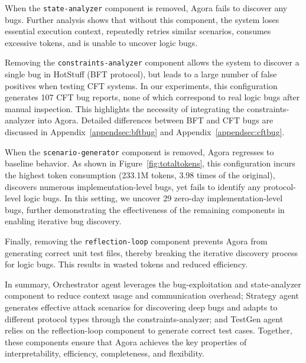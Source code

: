 \documentclass{article}
\theoremstyle{plain}
\theoremstyle{definition}
\theoremstyle{remark}
\newcommand{\consensustester}{Agora\xspace}
\newcommand{\agenta}{Orchestrator\xspace}
\newcommand{\agentb}{Strategy\xspace}
\newcommand{\agentc}{TestGen\xspace}
\begin{document}
When the \texttt{state-analyzer} component is removed, \consensustester fails to discover any bugs. Further analysis shows that without this component, the system loses essential execution context, repeatedly retries similar scenarios, consumes excessive tokens, and is unable to uncover logic bugs.

Removing the \texttt{constraints-analyzer} component allows the system to discover a single bug in HotStuff (BFT protocol), but leads to a large number of false positives when testing CFT systems. In our experiments, this configuration generates 107 CFT bug reports, none of which correspond to real logic bugs after manual inspection. This highlights the necessity of integrating the constraints-analyzer into \consensustester. Detailed differences between BFT and CFT bugs are discussed in Appendix~\ref{appendsec:bftbug} and Appendix~\ref{appendsec:cftbug}.

When the \texttt{scenario-generator} component is removed, \consensustester regresses to baseline behavior. As shown in Figure~\ref{fig:totaltokens}, this configuration incurs the highest token consumption (233.1M tokens, 3.98 times of the original), discovers numerous implementation-level bugs, yet fails to identify any protocol-level logic bugs. In this setting, we uncover 29 zero-day implementation-level bugs, further demonstrating the effectiveness of the remaining components in enabling iterative bug discovery.


Finally, removing the \texttt{reflection-loop} component prevents \consensustester from generating correct unit test files, thereby breaking the iterative discovery process for logic bugs. This results in wasted tokens and reduced efficiency.

In summary, \agenta agent leverages the bug-exploitation and state-analyzer component to reduce context usage and communication overhead; \agentb agent generates effective attack scenarios for discovering deep bugs and adapts to different protocol types through the constraints-analyzer; and \agentc agent relies on the reflection-loop component to generate correct test cases. Together, these components ensure that \consensustester achieves the key properties of interpretability, efficiency, completeness, and flexibility.






\end{document}

